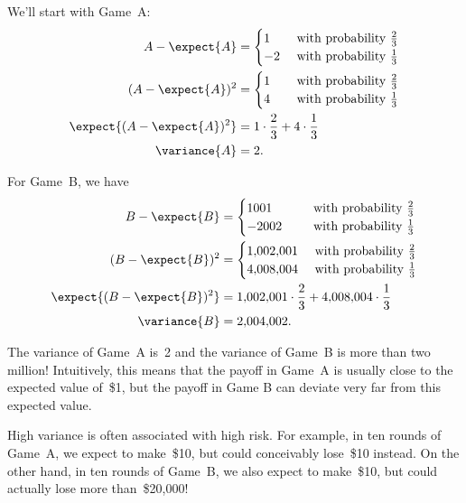 We'll start with Game~A:
\begin{align}
A - \expect{A}
        & = \begin{cases}
                 1 & \text{ with probability $\frac{2}{3}$} \\
                -2 & \text{ with probability $\frac{1}{3}$}
            \end{cases}
    \notag\\
(A - \expect{A})^2
        & = \begin{cases}
                1\phantom{-} & \text{ with probability $\frac{2}{3}$} \\
                4 & \text{ with probability $\frac{1}{3}$}
            \end{cases}
    \notag\\
\expect{(A - \expect{A})^2}
        & =     1 \cdot \frac{2}{3} + 4 \cdot \frac{1}{3} \notag\\
\variance{A} & =  2. \label{eqn:18A7}
\end{align}

For Game~B, we have
\begin{align*}
B - \expect{B}
        & = \begin{cases}
                1001\phantom{,001} & \text{ with probability $\frac{2}{3}$} \\
               -2002 & \text{ with probability $\frac{1}{3}$}
            \end{cases} \\
(B - \expect{B})^2
        & = \begin{cases}
                1{,}002{,}001 & \text{ with probability $\frac{2}{3}$} \\
                4{,}008{,}004 & \text{ with probability $\frac{1}{3}$}
            \end{cases} \\
\expect{(B - \expect{B})^2}
        & =     1{,}002{,}001 \cdot \frac{2}{3} + 4{,}008{,}004 \cdot \frac{1}{3} \\
\variance{B} & =   2{,}004{,}002.
\end{align*}

The variance of Game~A is~2 and the variance of Game~B is more than
two million!  Intuitively, this means that the payoff in Game~A is
usually close to the expected value of~\$1, but the payoff in Game B
can deviate very far from this expected value.

High variance is often associated with high risk.  For example, in ten
rounds of Game~A, we expect to make~\$10, but could conceivably
lose~\$10 instead.  On the other hand, in ten rounds of Game~B, we
also expect to make~\$10, but could actually lose more than~\$20,000!

